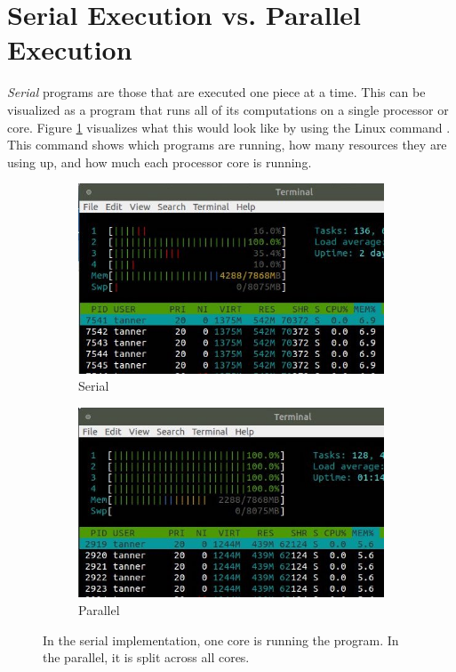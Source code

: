 \section*{Serial Execution vs. Parallel Execution}
\emph{Serial} programs are those that are executed one piece at a time.
This can be visualized as a program that runs all of its computations on a single processor or core.
Figure \ref{fig:htop} visualizes what this would look like by using the Linux command .
This command shows which programs are running, how many resources they are using up, and how much each processor core is running.

\begin{figure}[!tbp]
  \begin{subfigure}[b]{0.49\textwidth}
    \includegraphics[width=\textwidth]{figures/activenew.jpg}
    \caption{Serial}
  \end{subfigure}
  \hfill
  \begin{subfigure}[b]{0.49\textwidth}
    \includegraphics[width=\textwidth]{figures/cluster_activenew.jpg}
    \caption{Parallel}
  \end{subfigure}
  \caption{In the serial implementation, one core is running the program. In the parallel, it is split across all cores.}
  \label{fig:htop}
\end{figure}


